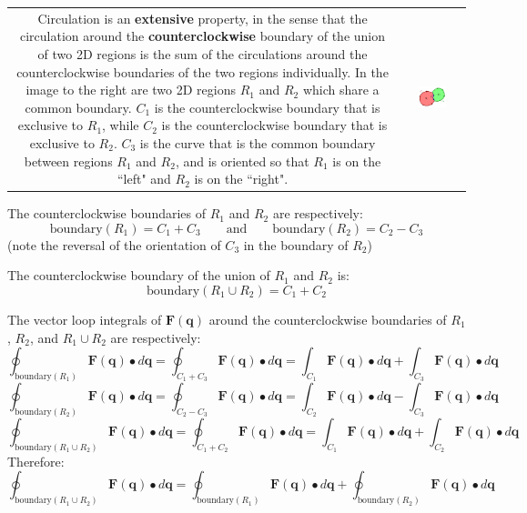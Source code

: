 \documentclass{article}
\begin{document}
\begin{tabular}{cc}
\parbox{0.5\textwidth}{
Circulation is an {\bf extensive} property, in the sense that the circulation around the {\bf counterclockwise} boundary of the union of two 2D regions is the sum of the circulations around the counterclockwise boundaries of the two regions individually. In the image to the right are two 2D regions \(R_1\) and \(R_2\) which share a common boundary. \(C_1\) is the counterclockwise boundary that is exclusive to \(R_1\), while \(C_2\) is the counterclockwise boundary that is exclusive to \(R_2\). \(C_3\) is the curve that is the common boundary between regions \(R_1\) and \(R_2\), and is oriented so that \(R_1\) is on the ``left" and \(R_2\) is on the ``right". 
} & \parbox{0.5\textwidth}{
\includegraphics[width = 0.5\textwidth]{loop_sum}
}
\end{tabular}

The counterclockwise boundaries of \(R_1\) and \(R_2\) are respectively:
\[\text{boundary}(R_1) = C_1 + C_3 \quad\quad\text{and}\quad\quad \text{boundary}(R_2) = C_2 - C_3\]
(note the reversal of the orientation of \(C_3\) in the boundary of \(R_2\))

The counterclockwise boundary of the union of \(R_1\) and \(R_2\) is:
\[\text{boundary}(R_1 \cup R_2) = C_1 + C_2\]

The vector loop integrals of \(\mathbf{F}(\mathbf{q})\) around the counterclockwise boundaries of \(R_1\), \(R_2\), and \(R_1 \cup R_2\) are respectively:
\[\oint_{\text{boundary}(R_1)} \mathbf{F}(\mathbf{q}) \bullet d\mathbf{q} = \oint_{C_1 + C_3} \mathbf{F}(\mathbf{q}) \bullet d\mathbf{q} = \int_{C_1} \mathbf{F}(\mathbf{q}) \bullet d\mathbf{q} + \int_{C_3} \mathbf{F}(\mathbf{q}) \bullet d\mathbf{q}\]
\[\oint_{\text{boundary}(R_2)} \mathbf{F}(\mathbf{q}) \bullet d\mathbf{q} = \oint_{C_2 - C_3} \mathbf{F}(\mathbf{q}) \bullet d\mathbf{q} = \int_{C_2} \mathbf{F}(\mathbf{q}) \bullet d\mathbf{q} - \int_{C_3} \mathbf{F}(\mathbf{q}) \bullet d\mathbf{q}\]
\[\oint_{\text{boundary}(R_1 \cup R_2)} \mathbf{F}(\mathbf{q}) \bullet d\mathbf{q} = \oint_{C_1 + C_2} \mathbf{F}(\mathbf{q}) \bullet d\mathbf{q} = \int_{C_1} \mathbf{F}(\mathbf{q}) \bullet d\mathbf{q} + \int_{C_2} \mathbf{F}(\mathbf{q}) \bullet d\mathbf{q}\]
Therefore:
\[\oint_{\text{boundary}(R_1 \cup R_2)} \mathbf{F}(\mathbf{q}) \bullet d\mathbf{q} = \oint_{\text{boundary}(R_1)} \mathbf{F}(\mathbf{q}) \bullet d\mathbf{q} + \oint_{\text{boundary}(R_2)} \mathbf{F}(\mathbf{q}) \bullet d\mathbf{q}\]
\end{document}
